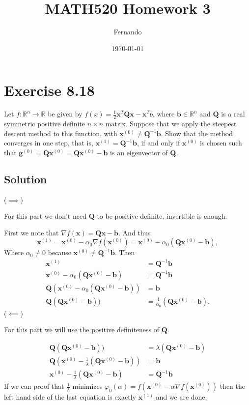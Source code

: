 \documentclass{article}
\newcommand{\bld}[1]{\boldsymbol{#1}}
\begin{document}
\title{MATH520 Homework 3}
\author{Fernando}
\date{\today}
\maketitle

\section*{Exercise 8.18}
Let $f:\mathbb{R}^n\to\mathbb{R}$ be given by
$f(x)=\frac{1}{2}\bld{x}^T\bld{Q}\bld{x}-\bld{x}^Tb$, where
$\bld{b}\in\mathbb{R}^n$ and $\bld{Q}$ is a real symmetric positive definite
$n\times n$ matrix. Suppose that we apply the steepest descent method to this
function, with $\bld{x}^{(0)}\neq \bld{Q}^{-1}\bld{b}$. Show that the method
converges in one step, that is, $\bld{x}^{(1)}=\bld{Q}^{-1}\bld{b}$, if and
only if $\bld{x}^{(0)}$ is chosen such that
$\bld{g}^{(0)}=\bld{Q}\bld{x}^{(0)}=\bld{Q}\bld{x}^{(0)}-\bld{b}$ is an
eigenvector of $\bld{Q}$.
\subsection*{Solution}
($\implies$)

For this part we don't need $\bld{Q}$ to be positive definite, invertible is
enough.

First we note that $\nabla f(\bld{x})=\bld{Q}\bld{x}-\bld{b}$. And thus
\[
\bld{x}^{(1)}=\bld{x}^{(0)}-\alpha_0\nabla
f(\bld{x}^{(0)})=\bld{x}^{(0)}-\alpha_0(\bld{Q}\bld{x}^{(0)}-\bld{b}),
\]
Where $\alpha_0\neq 0$ because $\bld{x}^{(0)}\neq \bld{Q}^{-1}\bld{b}$.
Then
\begin{align*}
	\bld{x}^{(1)}&=\bld{Q}^{-1}\bld{b}\\
	\bld{x}^{(0)}-\alpha_0(\bld{Q}\bld{x}^{(0)}-\bld{b})&=\bld{Q}^{-1}\bld{b}\\
	\bld{Q}(\bld{x}^{(0)}-\alpha_0(\bld{Q}\bld{x}^{(0)}-\bld{b}))&=\bld{b}\\
	\bld{Q}(\bld{Q}\bld{x}^{(0)}-\bld{b}))&=\frac{1}{\alpha_0}(\bld{Q}\bld{x}^{(0)}-\bld{b}).
\end{align*}
($\impliedby$)

For this part we will use the positive definiteness of $\bld{Q}$.

\begin{align*}
	\bld{Q}(\bld{Q}\bld{x}^{(0)}-\bld{b}))&=\lambda(\bld{Q}\bld{x}^{(0)}-\bld{b})\\
	\bld{Q}(\bld{x}^{(0)}-\frac{1}{\lambda}(\bld{Q}\bld{x}^{(0)}-\bld{b}))&=\bld{b}\\
	\bld{x}^{(0)}-\frac{1}{\lambda}(\bld{Q}\bld{x}^{(0)}-\bld{b})&=\bld{Q}^{-1}\bld{b}
\end{align*}
If we can proof that $\frac{1}{\lambda}$ minimizes
$\varphi_0(\alpha)=f(\bld{x}^{(0)}-\alpha \nabla f(\bld{x}^{(0)}))$ then the
left hand side of the last equation is exactly $\bld{x}^{(1)}$ and we are done.
\end{document}
